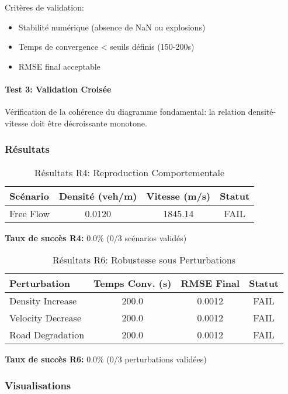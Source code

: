Critères de validation:
\begin{itemize}
    \item Stabilité numérique (absence de NaN ou explosions)
    \item Temps de convergence < seuils définis (150-200s)
    \item RMSE final acceptable
\end{itemize}

\paragraph{Test 3: Validation Croisée}
Vérification de la cohérence du diagramme fondamental: la relation densité-vitesse doit être décroissante monotone.

\subsubsection{Résultats}


\begin{table}[htbp]
\centering
\caption{Résultats R4: Reproduction Comportementale}
\begin{tabular}{lccc}
\toprule
\textbf{Scénario} & \textbf{Densité (veh/m)} & \textbf{Vitesse (m/s)} & \textbf{Statut} \\
\midrule
Free Flow & 0.0120 & 1845.14 & FAIL \\
\bottomrule
\end{tabular}
\end{table}


\textbf{Taux de succès R4:} 0.0\% (0/3 scénarios validés)


\begin{table}[htbp]
\centering
\caption{Résultats R6: Robustesse sous Perturbations}
\begin{tabular}{lccc}
\toprule
\textbf{Perturbation} & \textbf{Temps Conv. (s)} & \textbf{RMSE Final} & \textbf{Statut} \\
\midrule
Density Increase & 200.0 & 0.0012 & FAIL \\
Velocity Decrease & 200.0 & 0.0012 & FAIL \\
Road Degradation & 200.0 & 0.0012 & FAIL \\
\bottomrule
\end{tabular}
\end{table}


\textbf{Taux de succès R6:} 0.0\% (0/3 perturbations validées)


\subsubsection{Visualisations}


